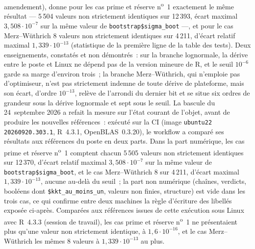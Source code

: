 \documentclass[a4paper,11pt]{article}
\newcommand{\code}[1]{\texttt{\small #1}}
\begin{document}
amendement), donne pour les cas prime et réserve n\textsuperscript{o}~1 exactement
le même résultat --- 5\,504 valeurs non strictement identiques sur 12\,393, écart
maximal $3{,}508\cdot 10^{-7}$ sur la même valeur de \code{bootstrap\$sigma\_boot}
---, et pour le cas Merz--Wüthrich 8 valeurs non strictement identiques sur
4\,211, d'écart relatif maximal $1{,}339\cdot 10^{-13}$ (statistique de la
première ligne de la table des tests). Deux enseignements, constatés et non
démontrés~: sur la branche lognormale, la dérive entre le poste et Linux ne
dépend pas de la version mineure de R, et le seuil $10^{-6}$ garde sa marge
d'environ trois~; la branche Merz--Wüthrich, qui n'emploie pas d'optimiseur,
n'est pas strictement indemne de toute dérive de plateforme, mais son écart,
d'ordre $10^{-13}$, relève de l'arrondi du dernier bit et se situe six ordres de
grandeur sous la dérive lognormale et sept sous le seuil. La bascule du 24~septembre 2026 a
refait la mesure sur l'état courant de l'objet, avant de produire les nouvelles
références~: exécuté sur la CI (image \code{ubuntu22 20260920.303.1}, R~4.3.1, OpenBLAS~0.3.20),
le workflow a comparé ses résultats aux références du poste en deux parts. Dans la part
numérique, les cas prime et réserve n\textsuperscript{o}~1 comptent chacun 5\,505 valeurs non
strictement identiques sur 12\,370, d'écart relatif maximal $3{,}508\cdot 10^{-7}$ sur la même
valeur de \code{bootstrap\$sigma\_boot}, et le cas Merz--Wüthrich 8 sur 4\,211, d'écart maximal
$1{,}339\cdot 10^{-13}$, aucune au-delà du seuil~; la part non numérique (chaînes, verdicts,
booléens dont \code{\$kkt\_au\_moins\_un}, valeurs non finies, structure) est vide dans les
trois cas, ce qui confirme entre deux machines la règle d'écriture des libellés exposée
ci-après. Comparées aux références issues de cette exécution sous Linux avec R~4.3.3 (session
de travail), les cas prime et réserve n\textsuperscript{o}~1 ne présentaient plus qu'une valeur
non strictement identique, à $1{,}6\cdot 10^{-16}$, et le cas Merz--Wüthrich les mêmes 8 valeurs à
$1{,}339\cdot 10^{-13}$ au plus.
\end{document}
